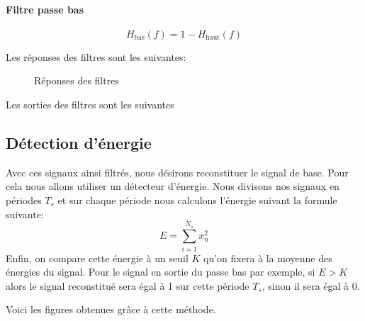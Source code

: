 \documentclass{article}
\begin{document}
\paragraph{Filtre passe bas}

\[
H_\text{bas}(f) = 1-H_\text{haut}(f)
\]

Les réponses des filtres sont les suivantes:

\begin{figure}[H]
	\centering
	\begin{minipage}{0.45\textwidth}
		\scalebox{0.5}{
		
	}
	\end{minipage}\hfill
	\begin{minipage}{0.45\textwidth}
		\scalebox{0.5}{
		
	}
	\end{minipage}
	\begin{minipage}{0.45\textwidth}
		\scalebox{0.5}{
		
	}
	\end{minipage}\hfill
	\begin{minipage}{0.45\textwidth}
		\scalebox{0.5}{
		
	}
	\end{minipage}
	\caption{Réponses des filtres}
	\label{fig:reponses-filtres}
\end{figure}

Les sorties des filtres sont les suivantes



\subsection{Détection d'énergie}


Avec ces signaux ainsi filtrés, nous désirons reconstituer le signal de base. Pour cela nous allons utiliser un détecteur d'énergie.
Nous divisons nos signaux en périodes $T_s$ et sur chaque période nous calculons l'énergie suivant la formule suivante:
\[
E=\sum_{i=1}^{N_s} x_n^2
\]
Enfin, on compare cette énergie à un seuil $K$ qu'on fixera à la moyenne des énergies du signal.
Pour le signal en sortie du passe bas par exemple, si $E>K$ alors le signal reconstitué sera égal à 1 sur cette période $T_s$, sinon il sera égal à 0.

Voici les figures obtenues grâce à cette méthode.

\begin{figure}
	\centering
	
\end{figure}
\end{document}
